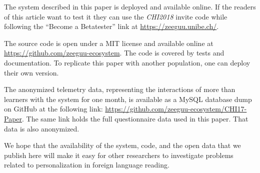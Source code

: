 The system described in this paper is deployed and available online. If the readers of this article want to test it they can use the {\em CHI2018} invite code while following the  ``Become a Betatester'' link at \url{https://zeeguu.unibe.ch/}.

The source code is open under a MIT license and available online at \url{https://github.com/zeeguu-ecosystem}. The code is covered by tests and documentation. To replicate this paper with another population, one can deploy their own version.

The anonymized telemetry data, representing the interactions of more than \students learners with the system for one month, is available as a MySQL database dump on GitHub at the following link: \url{https://github.com/zeeguu-ecosystem/CHI17-Paper}. The same link holds the full questionnaire data used in this paper. That data is also anonymized. 

We hope that the availability of the system, code, and the open data that we publish here will make it easy for other researchers to investigate problems related to personalization in foreign language reading.
